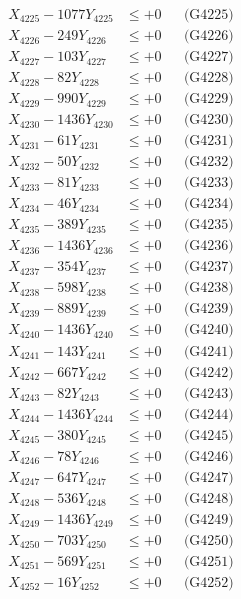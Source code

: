 \documentclass[a4paper,10pt]{article}
\begin{document}
{\begin{align}
X_{4225} - 1077Y_{4225} &\leq +0 && \text{(G4225)} \\
X_{4226} - 249Y_{4226} &\leq +0 && \text{(G4226)} \\
X_{4227} - 103Y_{4227} &\leq +0 && \text{(G4227)} \\
X_{4228} - 82Y_{4228} &\leq +0 && \text{(G4228)} \\
X_{4229} - 990Y_{4229} &\leq +0 && \text{(G4229)} \\
X_{4230} - 1436Y_{4230} &\leq +0 && \text{(G4230)} \\
\allowbreak
X_{4231} - 61Y_{4231} &\leq +0 && \text{(G4231)} \\
X_{4232} - 50Y_{4232} &\leq +0 && \text{(G4232)} \\
X_{4233} - 81Y_{4233} &\leq +0 && \text{(G4233)} \\
X_{4234} - 46Y_{4234} &\leq +0 && \text{(G4234)} \\
X_{4235} - 389Y_{4235} &\leq +0 && \text{(G4235)} \\
X_{4236} - 1436Y_{4236} &\leq +0 && \text{(G4236)} \\
X_{4237} - 354Y_{4237} &\leq +0 && \text{(G4237)} \\
X_{4238} - 598Y_{4238} &\leq +0 && \text{(G4238)} \\
X_{4239} - 889Y_{4239} &\leq +0 && \text{(G4239)} \\
X_{4240} - 1436Y_{4240} &\leq +0 && \text{(G4240)} \\
\allowbreak
X_{4241} - 143Y_{4241} &\leq +0 && \text{(G4241)} \\
X_{4242} - 667Y_{4242} &\leq +0 && \text{(G4242)} \\
X_{4243} - 82Y_{4243} &\leq +0 && \text{(G4243)} \\
X_{4244} - 1436Y_{4244} &\leq +0 && \text{(G4244)} \\
X_{4245} - 380Y_{4245} &\leq +0 && \text{(G4245)} \\
X_{4246} - 78Y_{4246} &\leq +0 && \text{(G4246)} \\
X_{4247} - 647Y_{4247} &\leq +0 && \text{(G4247)} \\
X_{4248} - 536Y_{4248} &\leq +0 && \text{(G4248)} \\
X_{4249} - 1436Y_{4249} &\leq +0 && \text{(G4249)} \\
X_{4250} - 703Y_{4250} &\leq +0 && \text{(G4250)} \\
\allowbreak
X_{4251} - 569Y_{4251} &\leq +0 && \text{(G4251)} \\
X_{4252} - 16Y_{4252} &\leq +0 && \text{(G4252)} \\

\end{align}}
\end{document}
